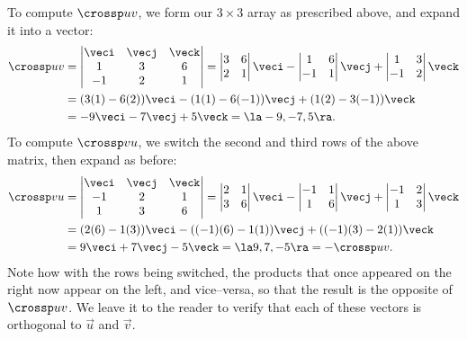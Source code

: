 {To compute $\crossp uv$, we form our $3\times 3$ array as prescribed above, and expand it into a vector:
\begin{align*}
\crossp uv &= \begin{vmatrix} \veci & \vecj & \veck\\ 1& 3& 6\\ -1& 2& 1\end{vmatrix} = \begin{vmatrix} 3& 6\\2 &1\end{vmatrix} \veci - \begin{vmatrix} 1 & 6\\ -1& 1\end{vmatrix}\vecj +\begin{vmatrix} 1& 3\\ -1 & 2\end{vmatrix}\veck\\
		& = (3(1)-6(2))\veci -(1(1)-6(-1))\vecj + (1(2)-3(-1))\veck\\
		& = -9\veci-7\vecj+5\veck = \la -9, -7, 5\ra.
\end{align*}
To compute $\crossp vu$, we switch the second and third rows of the above matrix, then expand as before:
\begin{align*}
\crossp vu & = \begin{vmatrix} \veci & \vecj& \veck\\ -1 & 2& 1\\ 1& 3& 6\end{vmatrix} = \begin{vmatrix} 2 &1\\3 &6\end{vmatrix}\veci - \begin{vmatrix} -1& 1\\ 1& 6\end{vmatrix}\vecj + \begin{vmatrix} -1& 2\\ 1 &3\end{vmatrix}\veck\\
		   & = (2(6)-1(3))\veci-((-1)(6)-1(1))\vecj + ((-1)(3)-2(1))\veck\\
		   & = 9\veci+7\vecj -5\veck = \la 9, 7, -5\ra = -\crossp uv.
\end{align*}
Note how with the rows being switched, the products that once appeared on the right now appear on the left, and vice--versa, so that the result is the opposite of $\crossp uv$. We leave it to the reader to verify that each of these vectors is orthogonal to $\vec u$ and $\vec v$.
}\\

